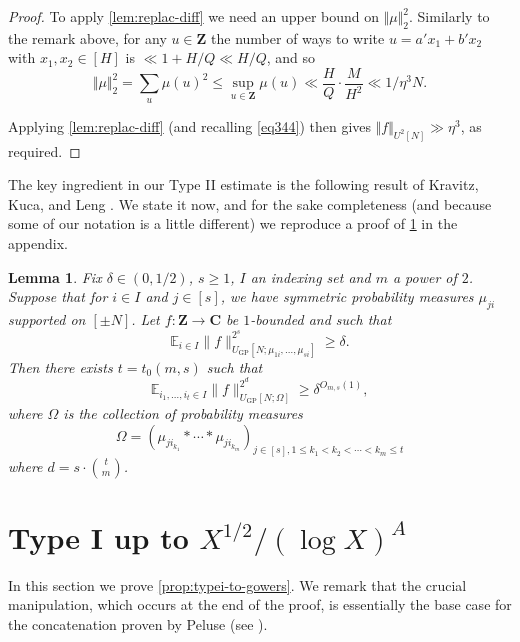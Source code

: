 \documentclass[11pt,reqno]{amsart}
\numberwithin{equation}{section}
\newtheorem{lemma}[theorem]{Lemma}
\theoremstyle{definition}
\theoremstyle{remark}
\newcommand{\snorm}[1]{\lVert#1\rVert}
\newcommand{\mb}{\mathbb}
\renewcommand{\le}{\leqslant}
\renewcommand{\ge}{\geqslant}
\newcommand\Z{\mathbf{Z}}
\newcommand\C{\mathbf{C}}
\newcommand\E{\mb{E}}
\newcommand\GP{\operatorname{GP}}
\begin{document}
\begin{proof}
To apply \cref{lem:replac-diff} we need an upper bound on $\Vert \mu \Vert_2^2$. Similarly to the remark above, for any $u \in \Z$ the number of ways to write $u = a'x_1 + b'x_2$ with $x_1, x_2 \in [H]$ is $\ll 1 + H/Q \ll H/Q$, and so 
\[ \Vert \mu\Vert_2^2 = \sum_u \mu(u)^2 \le \sup_{u \in \Z} \mu(u) \ll \frac{H}{Q} \cdot \frac{M}{H^2} \ll 1/\eta^3 N.\] 

Applying \cref{lem:replac-diff} (and recalling \cref{eq344}) then gives $\Vert f \Vert_{U^2[N]} \gg \eta^3$, as required.
\end{proof}



The key ingredient in our Type II estimate is the following result of Kravitz, Kuca, and Leng \cite[Corollary~6.4]{KKL24}. We state it now, and for the sake completeness (and because some of our notation is a little different) we reproduce a proof of \cref{lem:concat-main} in the appendix. 

\begin{lemma}\label{lem:concat-main}
Fix $\delta\in (0,1/2)$, $s\ge 1$, $I$ an indexing set and $m$ a power of $2$. Suppose that for $i\in I$ and $j\in [s]$, we have symmetric probability measures $\mu_{ji}$ supported on $[\pm N]$. Let $f:\Z\to \C$ be $1$-bounded and such that 
\[\E_{i\in I}\snorm{f}^{2^s}_{U_{\GP}[N;\mu_{1i},\ldots,\mu_{si}]}\ge \delta.\]
Then there exists $t = t_0(m, s)$ such that 
\[\E_{i_1,\ldots,i_t\in I}\snorm{f}_{ U_{\GP}[N; \Omega]}
^{2^d}\ge \delta^{O_{m,s}(1)},\]
where $\Omega$ is the collection of probability measures
\[ \Omega = (\mu_{ji_{k_1}} \ast \cdots \ast \mu_{ji_{k_m}})_{j\in [s], 1\le k_1<k_2<\cdots<k_{m}\le t}\]
where $d = s\cdot \binom{t}{m}$.
\end{lemma}


\section{Type I up to \texorpdfstring{$X^{1/2}/(\log X)^{A}$}{}}\label{section6}


In this section we prove \cref{prop:typei-to-gowers}. We remark that the crucial manipulation, which occurs at the end of the proof, is essentially the base case for the concatenation proven by Peluse \cite{Pel20} (see \cite[Lemma~5.4]{Pel20}).
\end{document}
